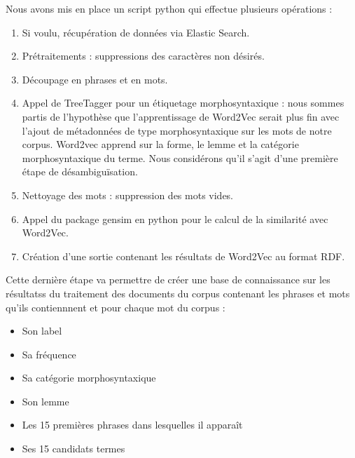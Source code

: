 Nous avons mis en place un script python qui effectue plusieurs opérations :
\begin{enumerate}

\item Si voulu, récupération de données via Elastic Search.
\item Prétraitements : suppressions des caractères non désirés.
\item Découpage en phrases et en mots.
\item Appel de TreeTagger \cite{Schmid94probabilisticpart-of-speech} pour un étiquetage morphosyntaxique : nous sommes partis de l'hypothèse que l'apprentissage de Word2Vec serait plus fin avec l'ajout de métadonnées de type morphosyntaxique sur les mots de notre corpus. Word2vec apprend sur la forme, le lemme et la catégorie morphosyntaxique du terme. Nous considérons qu'il s'agit d'une première étape de désambiguïsation.
\item Nettoyage des mots : suppression des mots vides.
\item Appel du package gensim en python pour le calcul de la similarité avec Word2Vec.
\item Création d'une sortie contenant les résultats de Word2Vec au format RDF.
\end{enumerate}
Cette dernière étape va permettre de créer une base de connaissance sur les résultatss du traitement des documents du corpus  contenant les phrases et mots qu'ils contiennnent et pour chaque mot du corpus :
\begin{itemize}
\item	Son label
\item	Sa fréquence
\item	Sa catégorie morphosyntaxique
\item	Son lemme
\item	Les 15 premières phrases dans lesquelles il apparaît
\item	Ses 15 candidats termes
\end{itemize}
